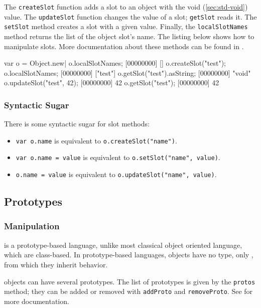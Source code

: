 The \lstinline|createSlot| function adds a slot to an object with the
void (\autoref{sec:std-void}) value. The \lstinline|updateSlot|
function changes the value of a slot; \lstinline|getSlot| reads
it. The \lstinline|setSlot| method creates a slot with a given
value. Finally, the \lstinline|localSlotNames| method returns the list of
the object slot's name. The listing below shows how to manipulate
slots. More documentation about these methods can be found in
.

\begin{urbiscript}[firstnumber=last]
var o = Object.new|
o.localSlotNames;
[00000000] []
o.createSlot("test");
o.localSlotNames;
[00000000] ["test"]
o.getSlot("test").asString;
[00000000] "void"
o.updateSlot("test", 42);
[00000000] 42
o.getSlot("test");
[00000000] 42
\end{urbiscript}

\subsubsection{Syntactic Sugar}

There is some syntactic sugar for slot methods:
\begin{itemize}
\item \lstinline|var o.name| is equivalent to
  \lstinline|o.createSlot("name")|.
\item \lstinline|var o.name = value| is equivalent to
  \lstinline|o.setSlot("name", value)|.
\item \lstinline|o.name = value| is equivalent to
  \lstinline|o.updateSlot("name", value)|.
\end{itemize}


\subsection{Prototypes}

\subsubsection{Manipulation}

\us is a prototype-based language, unlike most classical object
oriented language, which are class-based. In prototype-based
languages, objects have no type, only , from which they
inherit behavior.

\us objects can have several prototypes. The list of prototypes is
given by the \lstinline|protos| method; they can be added or removed
with \lstinline|addProto| and \lstinline|removeProto|.  See
 for more documentation.

